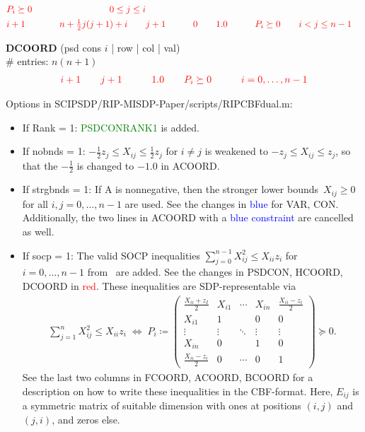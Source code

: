 \documentclass[11pt,a4paper]{article}
\newcommand{\define}{\coloneqq}
\theoremstyle{definition}
\begin{document}
{\[\begin{aligned}
    &{\color{red}P_i \succeq 0} \qquad &{\color{red}0 \leq j \leq i}\\ 
    &{\color{red}i+1} \qquad &{\color{red}n+\tfrac{1}{2}j(j+1)+i} \qquad &{\color{red}j+1} \qquad
    &{\color{red}0} \qquad &{\color{red}1.0} \qquad
    &{\color{red}P_i \succeq 0} \qquad &{\color{red}i < j \leq
      n-1 }
  \end{aligned}
\]
{\color{red}\textbf{DCOORD} (psd cons $i$ | row | col | val) \\
  \# entries: $n(n+1)$\\
  \[
    \begin{aligned}
      {\color{red} i+1} \qquad & {\color{red} j+1} \qquad & {\color{red}
        1.0} \qquad & {\color{red} P_i \succeq 0} \qquad & {\color{red} i =
        0, \dots, n-1}
    \end{aligned}
    \]

  }
}

Options in \textsf{SCIPSDP/RIP-MISDP-Paper/scripts/RIPCBFdual.m}:
\begin{itemize}
\item If Rank = 1: \textcolor{green}{PSDCONRANK1} is added.
\item If nobnds = 1: {\color{orange}
    $-\tfrac{1}{2}z_j \leq X_{ij} \leq \tfrac{1}{2}z_j$ for $i \neq j$} is
  weakened to {\color{orange}$-z_j \leq X_{ij} \leq z_j$}, so that the
  {\color{orange} $-\tfrac{1}{2}$} is changed to $-1.0$ in ACOORD.
\item If strgbnds = 1: If A is nonnegative, then the stronger lower
  bounds~$X_{ij} \geq 0$ for all $i,j =0,\dots,n-1$ are used. See the
  changes in \textcolor{blue}{blue} for VAR, CON. Additionally, the two
  lines in ACOORD with a \textcolor{blue}{blue constraint} are cancelled
  as well.
\item If socp = 1: The valid SOCP inequalities
  $\sum_{j=0}^{n-1}X_{ij}^2 \leq X_{ii}z_i$ for $i = 0,\dots,n-1$
  from~\cite{LiX20} are added. See the changes in PSDCON, HCOORD, DCOORD in
  \textcolor{red}{red}. These inequalities are SDP-representable via
  \begin{align*}
    \sum_{j=1}^n X_{ij}^2 \leq X_{ii}z_i \; \Leftrightarrow \;
    P_i \define \begin{pmatrix}
      \tfrac{X_{ii}+z_I}{2} & X_{i1} & \cdots & X_{in} & \tfrac{X_{ii}-z_i}{2}
      \\
      X_{i1} & 1 & & 0 & 0 \\
      \vdots &\vdots & \ddots & \vdots & \vdots \\
      X_{in} & 0 & & 1 & 0 \\
      \tfrac{X_{ii}-z_i}{2} & 0 & \cdots & 0 & 1
    \end{pmatrix} \succeq 0.
  \end{align*}
  See the last two columns in FCOORD, ACOORD, BCOORD for a description on
  how to write these inequalities in the CBF-format. Here, $E_{ij}$ is a
  symmetric matrix of suitable dimension with ones at positions $(i,j)$ and
  $(j,i)$, and zeros else.
\end{itemize}
\end{document}
